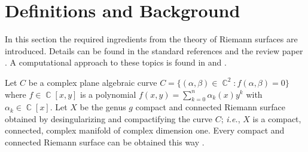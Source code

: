\documentclass[12pt]{article}
\theoremstyle{definition}
\DeclareMathOperator{\ZZ}{\mathbb{Z}}
\DeclareMathOperator{\CC}{\mathbb{C}}
\begin{document}
\section{Definitions and Background}\label{sec:background}


In this section the required ingredients from the theory of Riemann
surfaces are introduced. Details can be found in the standard references
\cite{FarkasKra92,Springer57} and the review paper \cite{Dubrovin81}. A
computational approach to these topics is found in
\cite{BobenkoKlein11,DeconinckPatterson08} and
\cite{DeconinckPatterson11}.

Let $C$ be a complex plane algebraic curve $C = \{(\alpha,\beta) \in
\CC^2 : f(\alpha,\beta) = 0\}$ where $f \in \CC[x,y]$ is a polynomial
$f(x,y) = \sum_{k=0}^n \alpha_k(x) y^k$ with $\alpha_k \in \CC[x]$. Let
$X$ be the genus $g$ compact and connected Riemann surface obtained by
desingularizing and compactifying the curve $C$; {\it i.e.}, $X$ is a
compact, connected, complex manifold of complex dimension one. Every
compact and connected Riemann surface can be obtained this way
\cite{Griffiths89}.

\end{document}
